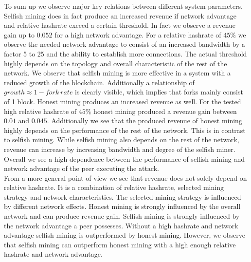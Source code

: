 To sum up we observe major key relations between different system parameters. Selfish mining does in fact produce an increased revenue if network advantage and relative hashrate exceed a certain threshold. In fact we observe a revenue gain up to $0.052$ for a high network advantage. For a relative hashrate of $45\% $ we observe the needed network advantage to consist of an increased bandwidth by a factor 5 to 25 and the ability to establish more connections. The actual threshold highly depends on the topology and overall characteristic of the rest of the network. We observe that selfish mining is more effective in a system with a reduced growth of the blockchain. Additionally a relationship of $growth \approx 1-fork~rate$ is clearly visible, which implies that forks mainly consist of 1 block. Honest mining produces an increased revenue as well. For the tested high relative hashrate of $45\% $ honest mining produced a revenue gain between $0.01$ and $0.045$. Additionally we see that the produced revenue of honest mining highly depends on the performance of the rest of the network. This is in contrast to selfish mining. While selfish mining also depends on the rest of the network, revenue can increase by increasing bandwidth and degree of the selfish miner. Overall we see a high dependence between the performance of selfish mining and network advantage of the peer executing the attack.\\
From a more general point of view we see that revenue does not solely depend on relative hashrate. It is a combination of relative hashrate, selected mining strategy and network characteristics. The selected mining strategy is influenced by different network effects. Honest mining is strongly influenced by the overall network and can produce revenue gain. Selfish mining is strongly influenced by the network advantage a peer possesses. Without a high hashrate and network advantage selfish mining is outperformed by honest mining. However, we observe that selfish mining can outperform honest mining with a high enough relative hashrate and network advantage.









 
